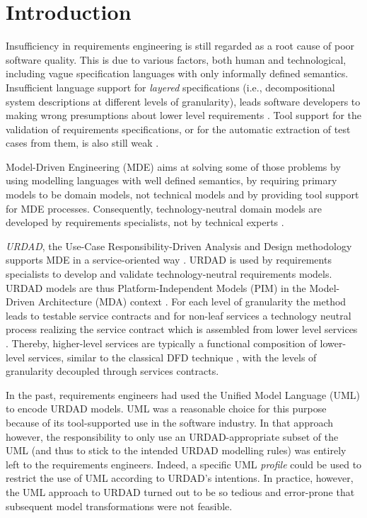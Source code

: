 \section{Introduction}
Insufficiency in requirements engineering is still regarded as a root cause of poor software quality. This is due to various factors, both human and technological, including vague specification languages with only informally defined semantics. Insufficient language support for \emph{layered} specifications (i.e., decompositional system descriptions at different levels of granularity), leads software developers to making wrong presumptions about lower level requirements \cite{espana_evaluating_2009}. Tool support for the validation of requirements specifications, or for the automatic extraction of test cases from them, is also still weak \cite{bashardoust-tajali_extracting_2008}.

Model-Driven Engineering (MDE) \cite{schmidt_model_2006} aims at solving some of those problems by using modelling languages with well defined semantics, by requiring primary models to be domain models, not technical models \cite{asnina_computation_2010} and by providing tool support for MDE processes. Consequently, technology-neutral domain models are developed by requirements specialists, not by technical experts \cite{asnina_computation_2010}.

\emph{URDAD}, the Use-Case Responsibility-Driven Analysis and Design methodology \cite{fritz_solms_technology_2007} supports MDE in a service-oriented way \cite{solms_urdad_2010}. URDAD is used by requirements specialists to develop and validate technology-neutral requirements models. URDAD models are thus Platform-Independent Models (PIM) in the Model-Driven Architecture (MDA) context \cite{solms_urdad_2010}. For each level of granularity the method leads to testable service contracts and for non-leaf services a technology neutral process realizing the service contract which is assembled from lower level services . Thereby, higher-level services are typically a functional composition of lower-level services, similar to the classical DFD technique \cite{demarco_tom_structured_1978}, with the levels of granularity decoupled through services contracts.

In the past, requirements engineers had used the Unified Model Language (UML) to encode URDAD models. UML was a reasonable choice for this purpose because of its tool-supported use in the software industry. In that approach however, the responsibility to only use an URDAD-appropriate subset of the UML (and thus to stick to the intended URDAD modelling rules) was entirely left to the requirements engineers. Indeed, a specific UML \emph{profile} could be used to restrict the use of UML according to URDAD's intentions. In practice, however, the UML approach to URDAD turned out to be so tedious and error-prone that subsequent model transformations were not feasible.

